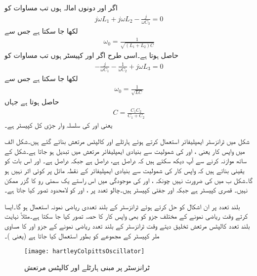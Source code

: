 اگر  اور  دونوں امالہ ہوں تب مساوات  کو
\begin{align*}
j \omega L_1 +j \omega L_2 -\frac{j}{\omega C_3}=0
\end{align*}
لکھا جا سکتا ہے جس سے
\begin{align}\label{مساوات_مرتعش_ہارٹلے_قدرتی_تعدد}
\omega_0=\frac{1}{\sqrt{\left(L_1+L_2 \right) C}}
\end{align}
حاصل ہوتا ہے۔اسی طرح اگر  اور  کپیسٹر ہوں تب مساوات  کو
\begin{align*}
-\frac{j}{\omega C_1}-\frac{1}{\omega C_2}+j \omega L_3=0
\end{align*}
لکھا جا سکتا ہے جس سے
\begin{align}\label{مساوات_مرتعش_کالپٹس_قدرتی_تعدد}
\omega_0=\frac{1}{\sqrt{L C}}
\end{align}
حاصل ہوتا ہے جہاں
\begin{align}
C=\frac{C_1 C_2}{C_1 + C_2}
\end{align}
یعنی  اور  کی سلسلہ وار جڑی کل کپیسٹر ہے۔

شکل  میں ٹرانزسٹر ایمپلیفائر استعمال کرتے ہوئے ہارٹلے اور کالپٹس مرتعش بنائے گئے ہیں۔شکل  الف میں واپس کار یعنی ،  اور  کی شمولیت سے بنیادی ایمپلیفائر مرتعش میں تبدیل ہو جاتا ہے۔شکل  کے ساتھ موازنہ کرنے سے آپ دیکھ سکتے ہیں کہ  دراصل  ہے،  دراصل  ہے جبکہ  دراصل  ہے۔ اور  اس بات کو یقینی بناتے ہیں کہ  واپس کار کی شمولیت سے بنیادی ایمپلیفائر کے نقطہ مائل پر کوئی اثر نہیں ہو گا۔شکل  ب میں  کی ضرورت نہیں چونکہ ،  اور  کی موجودگی میں اس راستے یک سمتی رو کا گزر ممکن نہیں۔ قصری کپیسٹر ہے جبکہ  اور  جفتی کپیسٹر ہیں۔چالو تعدد پر ،  اور  کو لامحدود تصور کیا جاتا ہے۔

بلند تعدد پر ان اشکال کو حل کرتے ہوئے ٹرانزسٹر کے بلند تعددی ریاضی نمونہ استعمال ہو گا۔ایسا کرتے وقت ریاضی نمونے کے مختلف جزو کو بھی واپس کار کا حصہ تصور کیا جا سکتا ہے۔مثلاً نہایت بلند تعدد کالپٹس مرتعش تخلیق دیتے وقت ٹرانزسٹر کے بلند تعدد ریاضی نمونے کے جزو  اور  کا مساوی ملر کپیسٹر  کے مجموعے کو بطور  استعمال کیا جاتا ہے (یعنی )۔
%
\begin{figure}
\centering
\texttt{[image: hartleyColpittsOscillator]}
\caption{ٹرانزسٹر پر مبنی ہارٹلے اور کالپٹس مرتعش}
\label{شکل_مرتعش_ہارٹلے_کالپٹس}
\end{figure}

